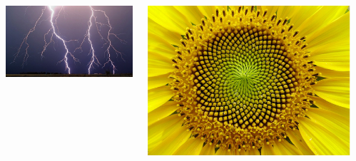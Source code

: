 \documentclass{beamer}
\begin{document}
\begin{frame}
\begin{columns}
\begin{column}{0.25\textwidth}
\begin{center}
					\end{center}
				\end{column}
				\begin{column}{0.25\textwidth}
					\begin{center}
						\includegraphics[width=1\linewidth]{"../Frattali in natura/intense-fulminazioni"}
					\end{center}
				\end{column}
				\begin{column}{0.25\textwidth}
					\begin{center}
						\includegraphics[width=1\linewidth]{"../Frattali in natura/fiore"}
					\end{center}
				\end{column}
			\end{columns}
		\end{frame}
\end{document}
